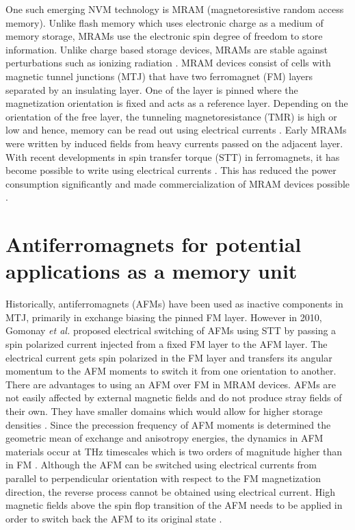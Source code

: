 \documentclass[10pt,doublespacing,edeposit]{uiucthesis2020}
\begin{document}
\begin{mainmatter}
One such emerging NVM technology is MRAM (magnetoresistive random access memory). Unlike flash memory which uses electronic charge as a medium of memory storage, MRAMs use the electronic spin degree of freedom to store information. Unlike charge based storage devices, MRAMs are stable against perturbations such as ionizing radiation \cite{Wadley2016}. MRAM devices consist of cells with magnetic tunnel junctions (MTJ) that have two ferromagnet (FM) layers separated by an insulating layer. One of the layer is pinned where the magnetization orientation is fixed and acts as a reference layer. Depending on the orientation of the free layer, the tunneling magnetoresistance (TMR) is high or low and hence, memory can be read out using electrical currents \cite{Krishnan2016}. Early MRAMs were written by induced fields from heavy currents passed on the adjacent layer. With recent developments in spin transfer torque (STT) in ferromagnets, it has become possible to write using electrical currents \cite{Chappert2007}. This has reduced the power consumption significantly and made commercialization of MRAM devices possible \cite{Krishnan2016,Bhatti2017}.

\section{Antiferromagnets for potential applications as a memory unit}

Historically, antiferromagnets (AFMs) have been used as inactive components in MTJ, primarily in exchange biasing the pinned FM layer. However in 2010, Gomonay \emph{et al.} \cite{Gomonay2010} proposed electrical switching of AFMs using STT by passing a spin polarized current injected from a fixed FM layer to the AFM layer. The electrical current gets spin polarized in the FM layer and transfers its angular momentum to the AFM moments to switch it from one orientation to another. There are advantages to using an AFM over FM in MRAM devices. AFMs are not easily affected by external magnetic fields and do not produce stray fields of their own. They have smaller domains which would allow for higher storage densities \cite{Wadley2016}. Since the precession frequency of AFM moments is determined the geometric mean of exchange and anisotropy energies, the dynamics in AFM materials occur at THz timescales which is two orders of magnitude higher than in FM \cite{Siddiqui2020}. Although the AFM can be switched using electrical currents from parallel to perpendicular orientation with respect to the FM magnetization direction, the reverse process cannot be obtained using electrical current. High magnetic fields above the spin flop transition of the AFM needs to be applied in order to switch back the AFM to its original state \cite{Gomonay2010}.


\end{mainmatter}
\end{document}

